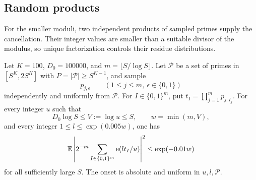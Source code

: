 \subsection{Random products}\label{subsec:random}

For the smaller moduli, two independent products of sampled primes supply
the cancellation.  Their integer values are smaller than a suitable
divisor of the modulus, so unique factorization controls their residue
distributions.

\begin{lemma}\label{lem:random}
Let \(K=100\), \(D_0=100000\), and \(m=\lfloor S/\log S\rfloor\).
Let \(\mathcal P\) be a set of primes in \([S^K,2S^K]\) with
\(P=|\mathcal P|\ge S^{K-1}\), and sample
\[
 p_{j,\epsilon}\qquad
 (1\le j\le m,\ \epsilon\in\{0,1\})
\]
independently and uniformly from \(\mathcal P\).  For
\(I\in\{0,1\}^m\), put \(t_I=\prod_{j=1}^m p_{j,I_j}\).
For every integer \(u\) such that
\[
 D_0\log S\le V:=\log u\le S,
 \qquad w=\min(m,V),
\]
and every integer \(1\le l\le \exp(0.005w)\), one has
\begin{equation}\label{eq:random-second-moment}
 \mathbb E\left|2^{-m}\sum_{I\in\{0,1\}^m}\mathrm e(lt_I/u)\right|^2
 \le \exp(-0.01w)
\end{equation}
for all sufficiently large \(S\).  The onset is absolute and uniform in
\(u,l,\mathcal P\).
\end{lemma}


